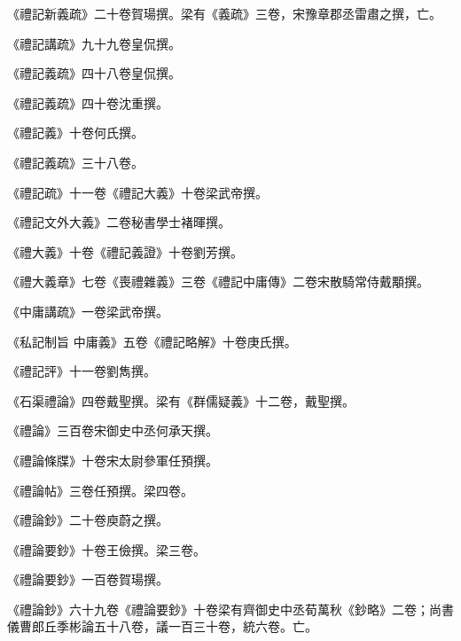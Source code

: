 \begin{pinyinscope}
 《禮記新義疏》二十卷賀瑒撰。梁有《義疏》三卷，宋豫章郡丞雷肅之撰，亡。



 《禮記講疏》九十九卷皇侃撰。



 《禮記義疏》四十八卷皇侃撰。



 《禮記義疏》四十卷沈重撰。



 《禮記義》十卷何氏撰。



 《禮記義疏》三十八卷。



 《禮記疏》十一卷《禮記大義》十卷梁武帝撰。



 《禮記文外大義》二卷秘書學士褚暉撰。



 《禮大義》十卷《禮記義證》十卷劉芳撰。



 《禮大義章》七卷《喪禮雜義》三卷《禮記中庸傳》二卷宋散騎常侍戴顒撰。



 《中庸講疏》一卷梁武帝撰。



 《私記制旨
 中庸義》五卷《禮記略解》十卷庚氏撰。



 《禮記評》十一卷劉雋撰。



 《石渠禮論》四卷戴聖撰。梁有《群儒疑義》十二卷，戴聖撰。



 《禮論》三百卷宋御史中丞何承天撰。



 《禮論條牒》十卷宋太尉參軍任預撰。



 《禮論帖》三卷任預撰。梁四卷。



 《禮論鈔》二十卷庾蔚之撰。



 《禮論要鈔》十卷王儉撰。梁三卷。



 《禮論要鈔》一百卷賀瑒撰。



 《禮論鈔》六十九卷《禮論要鈔》十卷梁有齊御史中丞荀萬秋《鈔略》二卷；尚書儀曹郎丘季彬論五十八卷，議一百三十卷，統六卷。亡。




\end{pinyinscope}

